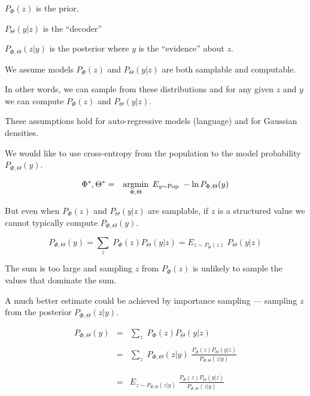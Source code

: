 {\vfill
$P_\Phi(z)$ is the prior.

\vfill
$P_\Theta(y|z)$ is the ``decoder''

\vfill
$P_{\Phi,\Theta}(z|y)$ is the posterior where $y$ is the ``evidence'' about $z$.



We assume models $P_\Phi(z)$ and $P_\Theta(y|z)$ are both samplable and computable.

\vfill
In other words, we can sample from these distributions and for any given $z$ and $y$ we can compute $P_\Phi(z)$ and $P_\Theta(y|z)$.

\vfill
These assumptions hold for auto-regressive models (language) and for Gaussian densities.



We would like to use cross-entropy from the population to the model probability $P_{\Phi,\Theta}(y)$.

\begin{eqnarray*}
\Phi^*,\Theta^* & = & \operatorname*{argmin}_{\Phi,\Theta} \;E_{y \sim \mathrm{Pop}}\;-\ln P_{\Phi,\Theta}(y)
\end{eqnarray*}


But even when $P_\Phi(z)$ and $P_\Theta(y|z)$ are samplable, if $z$ is a structured value we cannot typically compute $P_{\Phi,\Theta}(y)$.

\vfill
$$P_{\Phi,\Theta}(y) = \sum_z\;P_\Phi(z)P_\Theta(y|z) = E_{z\sim P_\Phi(z)}\;P_\Theta(y|z)$$

\vfill
The sum is too large and sampling $z$ from $P_\Phi(z)$ is unlikely to sample the values that dominate the sum.


\vfill
A much better estimate could be achieved by importance sampling --- sampling $z$ from the posterior $P_{\Phi,\Theta}(z|y)$.

{\huge
\begin{eqnarray*}
P_{\Phi,\Theta}(y) & = & \sum_z\;P_\Phi(z) P_\Theta(y|z) \\
\\
 & = & \sum_z\;P_{\Phi,\Theta}(z|y)\;\frac{P_\Phi(z)P_\Theta(y|z)}{P_{\Phi,\Theta}(z|y)} \\
 \\
 \\
  & = & E_{z\sim P_{\Phi,\Theta}(z|y)}\;\frac{P_\Phi(z)P_\Theta(y|z)}{P_{\Phi,\Theta}(z|y)}
\end{eqnarray*}
}

}
